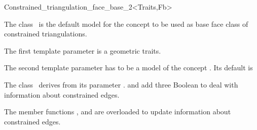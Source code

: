 

\begin{ccRefClass}{Constrained_triangulation_face_base_2<Traits,Fb>}  %


\ccDefinition
 The class \ccRefName\ is the default model for the concept
 to be used as base face class
of constrained triangulations.


\ccIsModel
{}

\ccParameters
The first template parameter is a geometric traits.

The second template parameter has to be a model
of the concept .
Its default is 

\ccInheritsFrom
The class \ccRefName\  derives from its parameter .
and add three Boolean to deal with information about
constrained edges.

The member functions , 
and  are overloaded  to update
information about constrained edges.

\ccSeeAlso
{} \\
\\
 \\


\end{ccRefClass}


